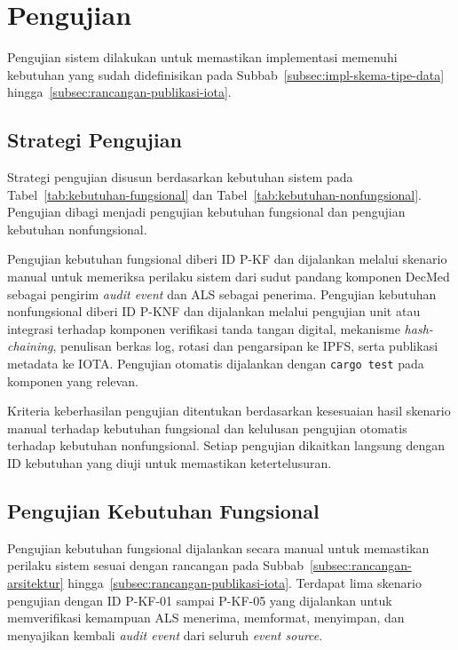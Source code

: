 \section{Pengujian}
\label{sec:pengujian}

Pengujian sistem dilakukan untuk memastikan implementasi memenuhi kebutuhan yang sudah didefinisikan pada Subbab~\ref{subsec:impl-skema-tipe-data} hingga~\ref{subsec:rancangan-publikasi-iota}.

\subsection{Strategi Pengujian}
\label{subsec:strategi-pengujian}

Strategi pengujian disusun berdasarkan kebutuhan sistem pada Tabel~\ref{tab:kebutuhan-fungsional} dan Tabel~\ref{tab:kebutuhan-nonfungsional}. Pengujian dibagi menjadi pengujian kebutuhan fungsional dan pengujian kebutuhan nonfungsional.

Pengujian kebutuhan fungsional diberi ID P-KF dan dijalankan melalui skenario manual untuk memeriksa perilaku sistem dari sudut pandang komponen DecMed sebagai pengirim \textit{audit event} dan ALS sebagai penerima. Pengujian kebutuhan nonfungsional diberi ID P-KNF dan dijalankan melalui pengujian unit atau integrasi terhadap komponen verifikasi tanda tangan digital, mekanisme \textit{hash-chaining}, penulisan berkas log, rotasi dan pengarsipan ke IPFS, serta publikasi metadata ke IOTA. Pengujian otomatis dijalankan dengan \texttt{cargo test} pada komponen yang relevan.

Kriteria keberhasilan pengujian ditentukan berdasarkan kesesuaian hasil skenario manual terhadap kebutuhan fungsional dan kelulusan pengujian otomatis terhadap kebutuhan nonfungsional. Setiap pengujian dikaitkan langsung dengan ID kebutuhan yang diuji untuk memastikan ketertelusuran.

\subsection{Pengujian Kebutuhan Fungsional}
\label{subsec:pengujian-fungsional}

Pengujian kebutuhan fungsional dijalankan secara manual untuk memastikan perilaku sistem sesuai dengan rancangan pada Subbab~\ref{subsec:rancangan-arsitektur} hingga~\ref{subsec:rancangan-publikasi-iota}. Terdapat lima skenario pengujian dengan ID P-KF-01 sampai P-KF-05 yang dijalankan untuk memverifikasi kemampuan ALS menerima, memformat, menyimpan, dan menyajikan kembali \textit{audit event} dari seluruh \textit{event source}.

